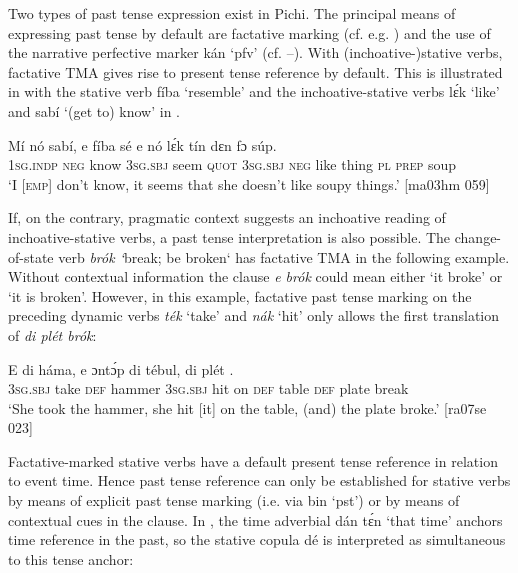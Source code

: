 Two types of past tense expression exist in Pichi. The principal means of expressing past tense by default are factative marking (cf. e.g. ) and the use of the narrative perfective{\fff} marker kán ‘pfv’ (cf. –). With (inchoative-)stative verbs, factative TMA gives rise to present tense{\fff} reference by default. This is illustrated in  with the stative verb fíba ‘resemble’ and the inchoative-stative verbs lɛ́k ‘like’ and sabí ‘(get to) know’ in . 


\ea%
    \label{ex:key:378}
    \gll Mí    nó  sabí,  e    fíba    sé    e    nó  lɛ́k
tín     dɛn  fɔ  súp.\\
\textsc{1sg.indp}  \textsc{neg}  know  \textsc{3sg.sbj}  seem  \textsc{quot}    \textsc{3sg.sbj}  \textsc{neg}  like
thing   \textsc{pl}  \textsc{prep}  soup\\

\glt ‘I \textsc{[emp]} don’t know, it seems that she doesn’t like soupy things.’ [ma03hm 059]
\z

If, on the contrary, pragmatic context suggests an inchoative reading of inchoative-stative verbs, a past tense interpretation is also possible. The change-of-state verb \textit{brók ‘}break; be broken‘ has factative TMA in the following example. Without contextual information the clause \textit{e brók} could mean either ‘it broke’ or ‘it is broken’. However, in this example, factative past tense marking on the preceding dynamic verbs \textit{ték} ‘take’ and \textit{nák} ‘hit’ only allows the first translation of \textit{di plét brók}: 


\ea%
    \label{ex:key:379}
    \gll E        di  háma,  e      ɔntɔ́p  di  tébul,
di  plét    .\\
\textsc{3sg.sbj}  take    \textsc{def}  hammer  \textsc{3sg.sbj}  hit  on    \textsc{def}  table
\textsc{def}  plate  break\\

\glt ‘She took the hammer, she hit [it] on the table, (and) the plate broke.’ [ra07se 023]
\z

Factative-marked stative verbs have a default present tense reference in relation to event time. Hence past tense reference can only be established for stative verbs by means of explicit past tense marking (i.e. via bin ‘pst’) or by means of contextual cues in the clause. In , the time adverbial dán tɛ́n ‘that time’ anchors time reference in the past, so the stative copula dé is interpreted as simultaneous to this tense anchor:


